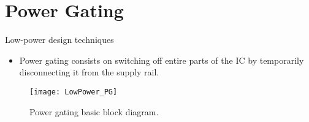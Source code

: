 \documentclass[]{slides}
\begin{document}
\section{Power Gating}
\begin{frame}{Low-power design techniques}{}
\begin{itemize}
\item Power gating consists on switching off entire parts of the \ac{IC} by temporarily disconnecting it from the supply rail.
\end{itemize}
\begin{figure}
\texttt{[image: LowPower\_PG]}
\caption{Power gating basic block diagram.}
\label{Figure:PG_block}
\end{figure}
\end{frame}
\end{document}
